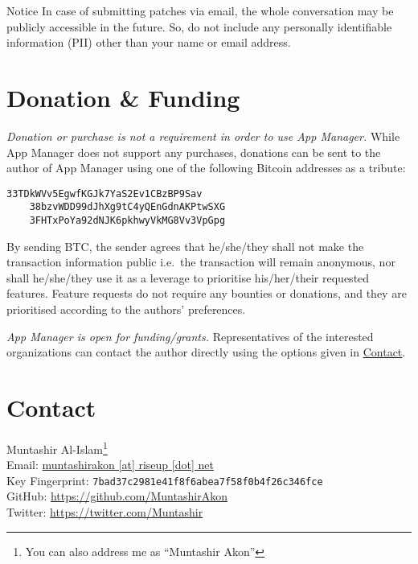 \begin{warning}{Notice}
    In case of submitting patches via email, the whole conversation may be publicly accessible in the future. So, do not
    include any personally identifiable information (PII) other than your name or email address.
\end{warning}

\section{Donation \& Funding}\label{sec:donation-&-funding}
\emph{Donation or purchase is not a requirement in order to use App Manager.} While App Manager does not support any
purchases, donations can be sent to the author of App Manager using one of the following Bitcoin addresses as a tribute:
\begin{Verbatim}[label={verb:btc-donation}]
    33TDkWVv5EgwfKGJk7YaS2Ev1CBzBP9Sav
    38bzvWDD99dJhXg9tC4yQEnGdnAKPtwSXG
    3FHTxPoYa92dNJK6pkhwyVkMG8Vv3VpGpg
\end{Verbatim}

By sending BTC, the sender agrees that he/she/they shall not make the transaction information public i.e.\ the
transaction will remain anonymous, nor shall he/she/they use it as a leverage to prioritise his/her/their requested
features. Feature requests do not require any bounties or donations, and they are prioritised according to the authors'
preferences.

\emph{App Manager is open for funding/grants.} Representatives of the interested organizations can contact the author
directly using the options given in \hyperref[sec:contact]{Contact}.

\section{Contact}\label{sec:contact}
Muntashir Al-Islam\footnote{You can also address me as ``Muntashir Akon''}\\
Email: \href{mailto:muntashirakon@riseup.net}{muntashirakon [at] riseup [dot] net}\\
Key Fingerprint: \texttt{7bad37c2981e41f8f6abea7f58f0b4f26c346fce}\\
GitHub: \url{https://github.com/MuntashirAkon}\\
Twitter: \url{https://twitter.com/Muntashir}
